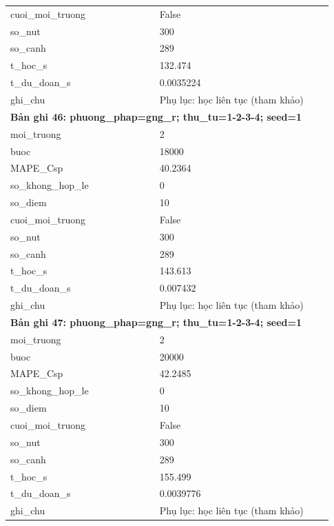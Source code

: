 \begin{longtable}{p{0.43\linewidth}p{0.50\linewidth}}
cuoi\_\allowbreak moi\_\allowbreak truong & False \\
so\_\allowbreak nut & 300 \\
so\_\allowbreak canh & 289 \\
t\_\allowbreak hoc\_\allowbreak s & 132.474 \\
t\_\allowbreak du\_\allowbreak doan\_\allowbreak s & 0.0035224 \\
ghi\_\allowbreak chu & Phụ lục: học liên tục (tham khảo) \\
\midrule
\multicolumn{2}{p{0.95\linewidth}}{\textbf{Bản ghi 46: phuong\_phap=gng\_r; thu\_tu=1-2-3-4; seed=1}} \\
moi\_\allowbreak truong & 2 \\
buoc & 18000 \\
MAPE\_\allowbreak Csp & 40.2364 \\
so\_\allowbreak khong\_\allowbreak hop\_\allowbreak le & 0 \\
so\_\allowbreak diem & 10 \\
cuoi\_\allowbreak moi\_\allowbreak truong & False \\
so\_\allowbreak nut & 300 \\
so\_\allowbreak canh & 289 \\
t\_\allowbreak hoc\_\allowbreak s & 143.613 \\
t\_\allowbreak du\_\allowbreak doan\_\allowbreak s & 0.007432 \\
ghi\_\allowbreak chu & Phụ lục: học liên tục (tham khảo) \\
\midrule
\multicolumn{2}{p{0.95\linewidth}}{\textbf{Bản ghi 47: phuong\_phap=gng\_r; thu\_tu=1-2-3-4; seed=1}} \\
moi\_\allowbreak truong & 2 \\
buoc & 20000 \\
MAPE\_\allowbreak Csp & 42.2485 \\
so\_\allowbreak khong\_\allowbreak hop\_\allowbreak le & 0 \\
so\_\allowbreak diem & 10 \\
cuoi\_\allowbreak moi\_\allowbreak truong & False \\
so\_\allowbreak nut & 300 \\
so\_\allowbreak canh & 289 \\
t\_\allowbreak hoc\_\allowbreak s & 155.499 \\
t\_\allowbreak du\_\allowbreak doan\_\allowbreak s & 0.0039776 \\
ghi\_\allowbreak chu & Phụ lục: học liên tục (tham khảo) \\

\end{longtable}
